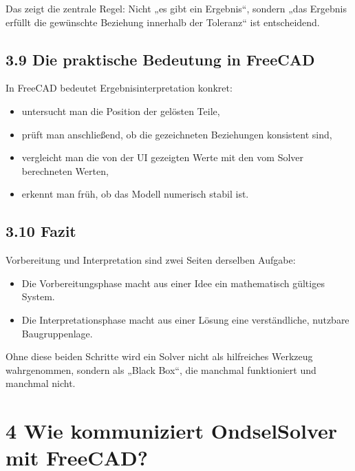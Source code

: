 \documentclass[
  12pt
]{book}
\providecommand{\tightlist}{%
  \setlength{\itemsep}{0pt}\setlength{\parskip}{0pt}}
\begin{document}
Das zeigt die zentrale Regel: Nicht „es gibt ein Ergebnis``, sondern
„das Ergebnis erfüllt die gewünschte Beziehung innerhalb der Toleranz``
ist entscheidend.

\hypertarget{die-praktische-bedeutung-in-freecad}{%
\section{\texorpdfstring{{3.9} Die praktische Bedeutung in
FreeCAD}{3.9 Die praktische Bedeutung in FreeCAD}}\label{die-praktische-bedeutung-in-freecad}}

In FreeCAD bedeutet Ergebnisinterpretation konkret:

\begin{itemize}
\tightlist
\item
  untersucht man die Position der gelösten Teile,
\item
  prüft man anschließend, ob die gezeichneten Beziehungen konsistent
  sind,
\item
  vergleicht man die von der UI gezeigten Werte mit den vom Solver
  berechneten Werten,
\item
  erkennt man früh, ob das Modell numerisch stabil ist.
\end{itemize}

\hypertarget{fazit-1}{%
\section{\texorpdfstring{{3.10} Fazit}{3.10 Fazit}}\label{fazit-1}}

Vorbereitung und Interpretation sind zwei Seiten derselben Aufgabe:

\begin{itemize}
\tightlist
\item
  Die Vorbereitungsphase macht aus einer Idee ein mathematisch gültiges
  System.
\item
  Die Interpretationsphase macht aus einer Lösung eine verständliche,
  nutzbare Baugruppenlage.
\end{itemize}

Ohne diese beiden Schritte wird ein Solver nicht als hilfreiches
Werkzeug wahrgenommen, sondern als „Black Box``, die manchmal
funktioniert und manchmal nicht.

\hypertarget{kap-kommunikation-mit-freecad}{%
\chapter{\texorpdfstring{{4} Wie kommuniziert OndselSolver mit
FreeCAD?}{4 Wie kommuniziert OndselSolver mit FreeCAD?}}\label{kap-kommunikation-mit-freecad}}
\end{document}
